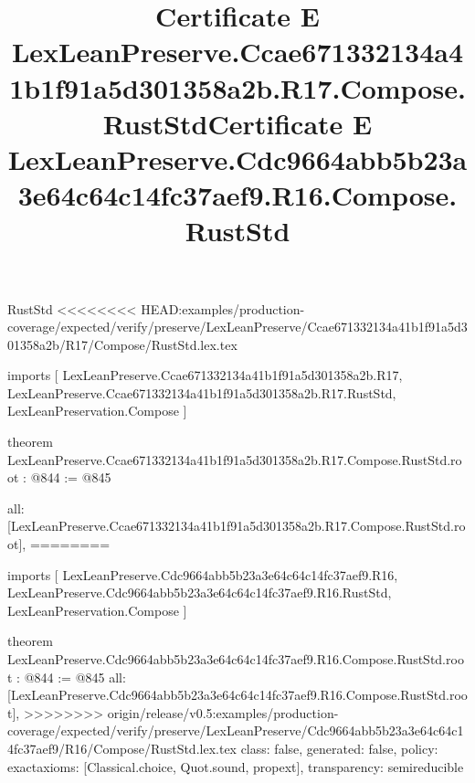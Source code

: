 \begin{lexlean}{RustStd}
<<<<<<<< HEAD:examples/production-coverage/expected/verify/preserve/LexLeanPreserve/Ccae671332134a41b1f91a5d301358a2b/R17/Compose/RustStd.lex.tex
\title{Certificate E LexLeanPreserve.Ccae671332134a41b1f91a5d301358a2b.R17.Compose.RustStd}
\begin{coremodule}
imports [
  LexLeanPreserve.Ccae671332134a41b1f91a5d301358a2b.R17,
  LexLeanPreserve.Ccae671332134a41b1f91a5d301358a2b.R17.RustStd,
  LexLeanPreservation.Compose
]

theorem LexLeanPreserve.Ccae671332134a41b1f91a5d301358a2b.R17.Compose.RustStd.root : @844 := @845 {
  all: [LexLeanPreserve.Ccae671332134a41b1f91a5d301358a2b.R17.Compose.RustStd.root],
========
\title{Certificate E LexLeanPreserve.Cdc9664abb5b23a3e64c64c14fc37aef9.R16.Compose.RustStd}
\begin{coremodule}
imports [
  LexLeanPreserve.Cdc9664abb5b23a3e64c64c14fc37aef9.R16,
  LexLeanPreserve.Cdc9664abb5b23a3e64c64c14fc37aef9.R16.RustStd,
  LexLeanPreservation.Compose
]

theorem LexLeanPreserve.Cdc9664abb5b23a3e64c64c14fc37aef9.R16.Compose.RustStd.root : @844 := @845 {
  all: [LexLeanPreserve.Cdc9664abb5b23a3e64c64c14fc37aef9.R16.Compose.RustStd.root],
>>>>>>>> origin/release/v0.5:examples/production-coverage/expected/verify/preserve/LexLeanPreserve/Cdc9664abb5b23a3e64c64c14fc37aef9/R16/Compose/RustStd.lex.tex
  class: false,
  generated: false,
  policy: exact{axioms: [Classical.choice, Quot.sound, propext]},
  transparency: semireducible
}


\end{coremodule}}
\end{coremodule}
\end{lexlean}
